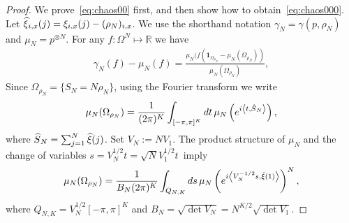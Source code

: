 \documentclass[AHL,Unicode,longabstracts,published]{cedram}
\newcommand{\ind}{\mathbf{1}}
\newcommand{\bbR}{\mathbb{R}}
\let\g=\gamma
\let\r=\rho
\let\O=\Omega
\let\oldhat\hat
\renewcommand*{\hat}[1]{\mathchoice{\widehat{#1}}{\widehat{#1}}{\oldhat{#1}}{\oldhat{#1}}}
\begin{document}
\begin{proof}
We prove~\eqref{eq:chaos00} first, and then show how to obtain~\eqref{eq:chaos000}. Let $\hat \xi_{i,x}(j)=\xi_{i,x}(j)-(\r_N)_{i,x}$. We use the shorthand notation $\g_N=\g(p,\r_N)$ and $\mu_N=p^{\otimes N}$. For any $f:\O^N\mapsto\bbR$ we have
\begin{align}\label{eq:chao1}
\g_N(f)-\mu_N(f)=\frac{\mu_N(f(\ind_{\O_{\r_N}}-\mu_N(\O_{\r_N}))}{\mu_N(\O_{\r_N})},
\end{align}
Since $\O_{\r_N}=\{S_N=N\r_N\}$, using the Fourier transform we write
\begin{align}\label{eq:chao2}
\mu_N(\O_{\r_N})=\frac1{(2\pi)^K}\int_{[-\pi,\pi]^K}d t \,\mu_N\left(e^{i\left\langle t,\hat S_N\right\rangle}\right),
\end{align}
where $\hat S_N=\sum_{j=1}^N\hat\xi(j)$. Set $V_N:=N V_1$. The product structure of $\mu_N$ and the change of variables $s= V_N^{1/2} t=\sqrt N V_1^{1/2} t\,$ imply
\begin{align}\label{eq:chao3}
\mu_N(\O_{\r_N})=\frac1{B_N(2\pi)^K}\int_{Q_{N,K}}d s \,\mu_N\left(e^{i\left\langle V_N^{-1/2} s,\hat\xi(1)\right\rangle}\right)^N,
\end{align}
where $Q_{N,K}=V_N^{1/2}[-\pi,\pi]^K$ and $B_N = \sqrt {\det V_N}=N^{K/2}\sqrt {\det V_1}$.


\end{proof}
\end{document}
